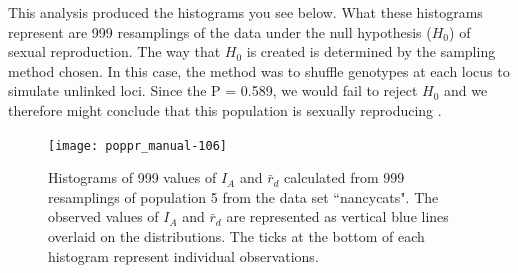 \documentclass[letterpaper]{article}
\begin{document}
This analysis produced the histograms you see below. What these histograms represent are 999 resamplings of the data under the null hypothesis ($H_0$) of sexual reproduction. The way that $H_0$ is created is determined by the sampling method chosen. In this case, the method was to shuffle genotypes at each locus to simulate unlinked loci. Since the P = 0.589, we would fail to reject $H_0$ and we therefore might conclude that this population is sexually reproducing \cite{Brown:1980} \cite{Smith:1993} \cite{Agapow:2001}.
\begin{figure}[h!]
  \centering
  \caption{\footnotesize Histograms of 999 values of $I_A$ and $\bar{r}_d$ calculated from 999 resamplings of population 5 from the data set ``nancycats". The observed values of $I_A$ and $\bar r_d$ are represented as vertical blue lines overlaid on the distributions. The ticks at the bottom of each histogram represent individual observations.}
  \label{ia_demo_fig}
\texttt{[image: poppr\_manual-106]}
\end{figure}
\end{document}

